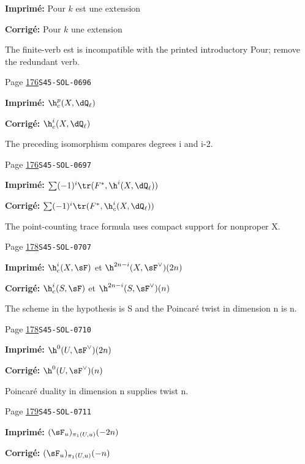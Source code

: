 \begin{description}
\par\noindent\textbf{Imprimé:} Pour $k$ est une extension
\par\noindent\textbf{Corrigé:} Pour $k$ une extension
\par\noindent The finite-verb est is incompatible with the printed introductory Pour; remove the redundant verb.
\smallskip
\item[\hypertarget{apparatus:FR-0140}{140}] Page \hyperlink{printpage:fr:176}{176}\quad\texttt{S45-SOL-0696}
\par\noindent\textbf{Imprimé:} \(\h_c^p(X,\dQ_\ell)\)
\par\noindent\textbf{Corrigé:} \(\h_c^i(X,\dQ_\ell)\)
\par\noindent The preceding isomorphism compares degrees i and i-2.
\smallskip
\item[\hypertarget{apparatus:FR-0141}{141}] Page \hyperlink{printpage:fr:176}{176}\quad\texttt{S45-SOL-0697}
\par\noindent\textbf{Imprimé:} \(\sum (-1)^i \tr(F^\ast,\h^i(X,\dQ_\ell))\)
\par\noindent\textbf{Corrigé:} \(\sum (-1)^i \tr(F^\ast,\h_c^i(X,\dQ_\ell))\)
\par\noindent The point-counting trace formula uses compact support for nonproper X.
\smallskip
\item[\hypertarget{apparatus:FR-0142}{142}] Page \hyperlink{printpage:fr:178}{178}\quad\texttt{S45-SOL-0707}
\par\noindent\textbf{Imprimé:} $\h_c^i(X,\sF)$ et $\h^{2n-i}(X,\sF^\vee)(2n)$
\par\noindent\textbf{Corrigé:} $\h_c^i(S,\sF)$ et $\h^{2n-i}(S,\sF^\vee)(n)$
\par\noindent The scheme in the hypothesis is S and the Poincaré twist in dimension n is n.
\smallskip
\item[\hypertarget{apparatus:FR-0143}{143}] Page \hyperlink{printpage:fr:178}{178}\quad\texttt{S45-SOL-0710}
\par\noindent\textbf{Imprimé:} \(\h^0(U,\sF^\vee)(2n)\)
\par\noindent\textbf{Corrigé:} \(\h^0(U,\sF^\vee)(n)\)
\par\noindent Poincaré duality in dimension n supplies twist n.
\smallskip
\item[\hypertarget{apparatus:FR-0144}{144}] Page \hyperlink{printpage:fr:179}{179}\quad\texttt{S45-SOL-0711}
\par\noindent\textbf{Imprimé:} \((\sF_u)_{\pi_1(U,u)}(-2n)\)
\par\noindent\textbf{Corrigé:} \((\sF_u)_{\pi_1(U,u)}(-n)\)

\end{description}
